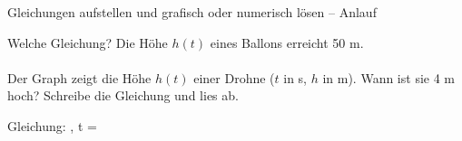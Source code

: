 \begin{aufgabe}{Gleichungen aufstellen und grafisch oder numerisch lösen – Anlauf}
\begin{teile}
\teil Welche Gleichung? Die Höhe $h(t)$ eines Ballons erreicht 50 m.  \\  \\ 
\teil Der Graph zeigt die Höhe $h(t)$ einer Drohne ($t$ in s, $h$ in m). Wann ist sie 4 m hoch? Schreibe die Gleichung und lies ab.

\begin{ksys}[xmin=0,xmax=6,ymin=0,ymax=6,ablesen]  \end{ksys}
Gleichung: \leerfeld , t = \leerfeld
\end{teile}
\end{aufgabe}

